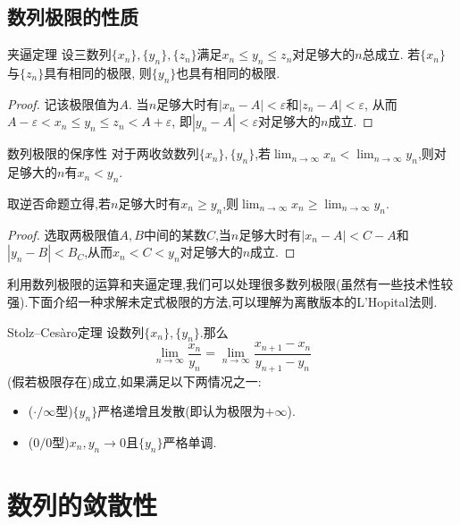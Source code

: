 \subsection{数列极限的性质}

\begin{theorem}{夹逼定理}
	设三数列$\{ x_n \},\{ y_n \},\{ z_n \}$满足$x_n \leq y_n \leq z_n$对足够大的$n$总成立. 若$\{ x_n \}$与$\{ z_n \}$具有相同的极限, 则$\{ y_n \}$也具有相同的极限.
\end{theorem}
\begin{proof}
	记该极限值为$A$. 当$n$足够大时有$|x_n-A|<\varepsilon$和$|z_n-A|<\varepsilon$, 从而$A-\varepsilon < x_n \leq y_n \leq z_n < A+\varepsilon$, 即$|y_n-A|<\varepsilon$对足够大的$n$成立.
\end{proof}

\begin{theorem}{数列极限的保序性}
	对于两收敛数列$\{ x_n \},\{ y_n \}$,若$\lim_{n \to \infty} x_n < \lim_{n \to \infty} y_n$,则对足够大的$n$有$x_n<y_n$.
\end{theorem}
\begin{remark}
	取逆否命题立得,若$n$足够大时有$x_n \geq y_n$,则$\lim_{n \to \infty} x_n \geq \lim_{n \to \infty} y_n$.
\end{remark}
\begin{proof}
	选取两极限值$A,B$中间的某数$C$,当$n$足够大时有$|x_n-A|<C-A$和$|y_n-B|<B_C$,从而$x_n<C<y_n$对足够大的$n$成立.
\end{proof}

利用数列极限的运算和夹逼定理,我们可以处理很多数列极限(虽然有一些技术性较强).下面介绍一种求解未定式极限的方法,可以理解为离散版本的L'Hopital法则.

\begin{theorem}{Stolz–Cesàro定理}
	设数列$\{ x_n \},\{ y_n \}$.那么$$\lim_{n\to \infty} \frac{x_n}{y_n} = \lim_{n\to \infty} \frac{x_{n+1}-x_n}{y_{n+1}-y_n}$$(假若极限存在)成立,如果满足以下两情况之一:
	\begin{itemize}
		\item ($\cdot / \infty$型)$\{ y_n \}$严格递增且发散(即认为极限为$+\infty$).
		\item ($0/0$型)$x_n,y_n \to 0$且$\{ y_n \}$严格单调.
	\end{itemize}
\end{theorem}

\section{数列的敛散性}

